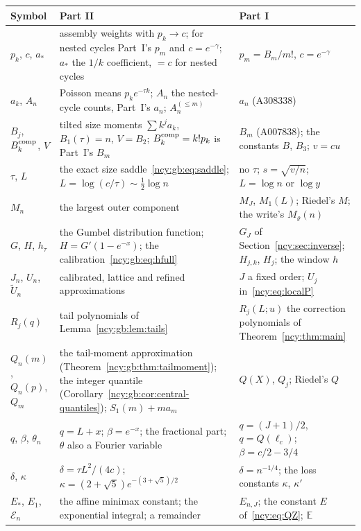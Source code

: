 \documentclass[11pt,letterpaper]{article}
\numberwithin{equation}{section}
\theoremstyle{remark}\newtheorem{remark}[theorem]{Remark}
\newcommand{\EE}{\mathbb E}
\theoremstyle{definition}\newtheorem{definition}[theorem]{Definition}\theoremstyle{plain}
\newcommand{\cE}{\mathcal E}
\begin{document}
\begingroup\small
\renewcommand{\arraystretch}{1.1}
\renewcommand{\theHtable}{ncygb.notation}%
\begin{longtable}{@{}>{\raggedright\arraybackslash}p{0.95in}>{\raggedright\arraybackslash}p{3.0in}>{\raggedright\arraybackslash}p{2.2in}@{}}
\toprule
Symbol & Part II & Part I\\
\midrule
\endhead
$p_k$, $c$, $a_*$ & assembly weights with $p_k\to c$; for nested cycles Part~I's $p_m$ and $c=e^{-\gamma}$; $a_*$ the $1/k$ coefficient, $=c$ for nested cycles & $p_m=B_m/m!$, $c=e^{-\gamma}$\\
$a_k$, $A_n$ & Poisson means $p_ke^{-\tau k}$; $A_n$ the nested-cycle counts, Part~I's $a_n$; $A_n^{(\le m)}$ & $a_n$ (A308338)\\
$B_j$, $B_k^{\rm comp}$, $V$ & tilted size moments $\sum k^ja_k$, $B_1(\tau)=n$, $V=B_2$; $B_k^{\rm comp}=k!p_k$ is Part~I's $B_m$ & $B_m$ (A007838); the constants $B$, $B_3$; $v=cu$\\
$\tau$, $L$ & the exact size saddle~\eqref{ncy:gb:eq:saddle}; $L=\log(c/\tau)\sim\frac12\log n$ & no $\tau$; $s=\sqrt{v/n}$; $L=\log n$ or $\log y$\\
$M_n$ & the largest outer component & $M_J$, $M_1(L)$; Riedel's $M$; the write's $M_\varrho(n)$\\
$G$, $H$, $h_\tau$ & the Gumbel distribution function; $H=G'(1-e^{-x})$; the calibration~\eqref{ncy:gb:eq:hfull} & $G_J$ of Section~\ref{ncy:sec:inverse}; $H_{j,k}$, $H_j$; the window $h$\\
$J_n$, $U_n$, $\widetilde U_n$ & calibrated, lattice and refined approximations & $J$ a fixed order; $U_j$ in~\eqref{ncy:eq:localP}\\
$R_j(q)$ & tail polynomials of Lemma~\ref{ncy:gb:lem:tails} & $R_j(L;u)$ the correction polynomials of Theorem~\ref{ncy:thm:main}\\
$Q_n(m)$, $Q_n(p)$, $Q_m$ & the tail-moment approximation (Theorem~\ref{ncy:gb:thm:tailmoment}); the integer quantile (Corollary~\ref{ncy:gb:cor:central-quantiles}); $S_1(m)+ma_m$ & $Q(X)$, $Q_j$; Riedel's $Q$\\
$q$, $\beta$, $\theta_n$ & $q=L+x$; $\beta=e^{-x}$; the fractional part; $\theta$ also a Fourier variable & $q=(J+1)/2$, $q=Q(\ell_c)$; $\beta=c/2-3/4$\\
$\delta$, $\kappa$ & $\delta=\tau L^2/(4c)$; $\kappa=(2+\sqrt5)e^{-(3+\sqrt5)/2}$ & $\delta=n^{-1/4}$; the loss constants $\kappa$, $\kappa'$\\
$E_*$, $E_1$, $\cE_n$ & the affine minimax constant; the exponential integral; a remainder & $E_{n,J}$; the constant $E$ of~\eqref{ncy:eq:QZ}; $\EE$\\

\end{longtable}
\end{document}
